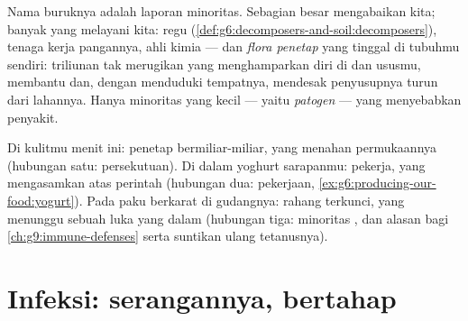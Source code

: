 \begin{proposition}\label{prop:g9:microbes-and-infection:mostly}
Nama buruknya adalah laporan minoritas. Sebagian besar
 mengabaikan kita; banyak yang melayani kita: regu
(\cref{def:g6:decomposers-and-soil:decomposers}), tenaga
kerja pangannya, ahli kimia  --- dan \emph{flora
penetap} yang tinggal di tubuhmu
sendiri: triliunan  tak merugikan yang menghamparkan
diri di  dan ususmu, membantu  dan,
 dengan menduduki tempatnya, mendesak penyusupnya
turun dari lahannya. Hanya minoritas yang kecil --- yaitu
\emph{patogen} --- yang menyebabkan penyakit.
\end{proposition}
\admitted

\begin{example}\label{ex:g9:microbes-and-infection:relations}
Di kulitmu menit ini: penetap bermiliar-miliar, yang menahan
permukaannya (hubungan satu: persekutuan). Di dalam yoghurt
sarapanmu: pekerja, yang mengasamkan atas perintah (hubungan
dua: pekerjaan, \cref{ex:g6:producing-our-food:yogurt}).
Pada paku berkarat di gudangnya:   rahang
terkunci, yang menunggu sebuah luka yang dalam (hubungan
tiga: minoritas , dan alasan bagi
\cref{ch:g9:immune-defenses} serta suntikan ulang
tetanusnya).
\end{example}

\section{Infeksi: serangannya, bertahap}


